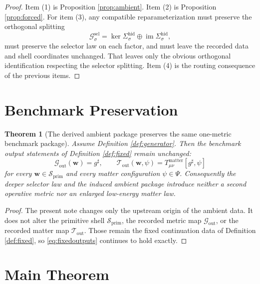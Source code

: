 \documentclass[11pt]{article}
\newcommand{\CompletedMetric}{g^{\sharp}}
\newcommand{\PrimShell}{\mathcal S_{\mathrm{prim}}}
\newcommand{\MetricOut}{\mathscr G_{\mathrm{out}}}
\newcommand{\MatterOut}{\mathscr T_{\mathrm{out}}}
\newcommand{\GenSpace}[1]{\mathcal G_{#1}^{\mathrm{sel}}}
\newcommand{\HiddenSel}[1]{\Sigma_{#1}^{\mathrm{hid}}}
\newtheorem{theorem}{Theorem}
\begin{document}
\begin{proof}
Item (1) is Proposition \ref{prop:ambient}. Item (2) is Proposition \ref{prop:forced}. For item (3), any compatible reparameterization must preserve the orthogonal splitting
\[
\GenSpace{\sigma}
=
\ker\HiddenSel{\sigma}\oplus\operatorname{im}\HiddenSel{\sigma},
\]
must preserve the selector law on each factor, and must leave the recorded data and shell coordinates unchanged. That leaves only the obvious orthogonal identification respecting the selector splitting. Item (4) is the routing consequence of the previous items.
\end{proof}

\section{Benchmark Preservation}

\begin{theorem}[The derived ambient package preserves the same one-metric benchmark package]
\label{thm:outputs}
Assume Definition \ref{def:generator}. Then the benchmark output statements of Definition \ref{def:fixed} remain unchanged:
\[
\MetricOut(\mathbf w)=\CompletedMetric,
\qquad
\MatterOut(\mathbf w,\psi)
=
T_{\mu\nu}^{\mathrm{matter}}[\CompletedMetric,\psi]
\]
for every \(\mathbf w\in\PrimShell\) and every matter configuration \(\psi\in\Psi\). Consequently the deeper selector law and the induced ambient package introduce neither a second operative metric nor an enlarged low-energy matter law.
\end{theorem}

\begin{proof}
The present note changes only the upstream origin of the ambient data. It does not alter the primitive shell \(\PrimShell\), the recorded metric map \(\MetricOut\), or the recorded matter map \(\MatterOut\). Those remain the fixed continuation data of Definition \ref{def:fixed}, so \eqref{eq:fixedoutputs} continues to hold exactly.
\end{proof}

\section{Main Theorem}
\end{document}
